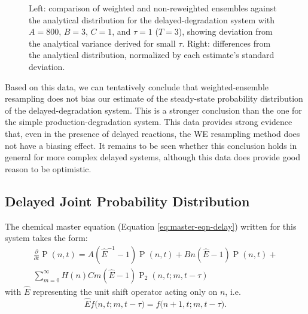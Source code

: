 \documentclass[english,letterpaper,12pt]{report}
\DeclareMathOperator{\Prob}{P}
\begin{document}
\begin{doublespacing}
\begin{figure}[t]
    \makebox[\linewidth][c]{
        \begin{subfigure}{3in}
            \begin{center}
                
            \end{center}
            \label{sfg:ddwe1-comp}
        \end{subfigure}
        \begin{subfigure}{3in}
            \begin{center}
                
            \end{center}
            \label{sfg:ddwe1-chi}
        \end{subfigure}
    }
    \caption{Left: comparison of weighted and non-reweighted ensembles against the analytical distribution for the delayed-degradation system with $A=800$, $B=3$, $C=1$, and $\tau=1$ ($T=3$), showing deviation from the analytical variance derived for small $\tau$. Right: differences from the analytical distribution, normalized by each estimate's standard deviation.}
    \label{fig:ddwe1}
\end{figure}

Based on this data, we can tentatively conclude that weighted-ensemble resampling does not bias our estimate of the steady-state probability distribution of the delayed-degradation system. This is a stronger conclusion than the one for the simple production-degradation system. This data provides strong evidence that, even in the presence of delayed reactions, the WE resampling method does not have a biasing effect. It remains to be seen whether this conclusion holds in general for more complex delayed systems, although this data does provide good reason to be optimistic.


\subsection{Delayed Joint Probability Distribution} %
\label{sub:delayed-joint-dist}
The chemical master equation (Equation \eqref{eq:master-eqn-delay}) written for this system takes the form:
\begin{multline}
    \frac{\partial}{\partial t} \Prob(n, t) = A(\hat{E}^{-1} - 1) \Prob(n, t) + B n(\hat{E} - 1) \Prob(n, t) + \\
    \sum_{m=0}^{\infty} H(n) C m (\hat{E} - 1) \Prob_2(n, t; m, t - \tau)
    \label{eq:master-eqn-dd}
\end{multline}
with $\hat{E}$ representing the unit shift operator acting only on $n$, i.e.
\[
    \hat{E}{f(n,t;} {m,t-\tau)} = {f(n+1,t;} {m,t-\tau)}.
\]


\end{doublespacing}
\end{document}
